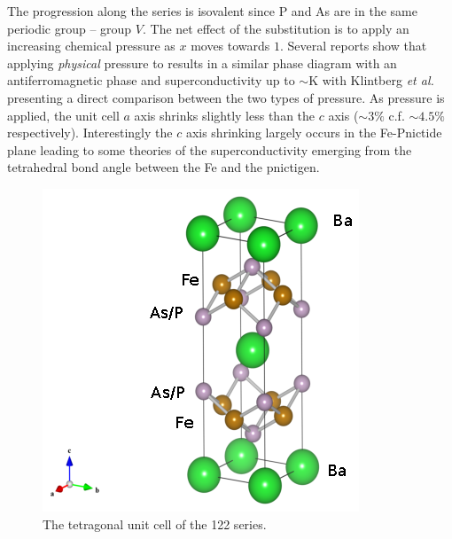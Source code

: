  The progression along the series is isovalent since P and As are in the same periodic group -- group $V$. The net effect of the substitution is to apply an increasing chemical pressure as $x$ moves towards $1$. Several reports show that applying \textit{physical} pressure to \BaFeAs results in a similar phase diagram with an antiferromagnetic phase and superconductivity up to $\sim$\unit[30]{K}\cite{Yamazaki2010,Colombier2009,Alireza2009} with Klintberg \textit{et al.}\cite{Klintberg2010} presenting a direct comparison between the two types of pressure. As pressure is applied, the unit cell $a$ axis shrinks slightly less than the $c$ axis ($\sim3\%$ c.f. $\sim4.5\%$ respectively). Interestingly the $c$ axis shrinking largely occurs in the Fe-Pnictide plane leading to some theories of the superconductivity emerging from the tetrahedral bond angle between the Fe and the pnictigen. %
\begin{figure}[htbp]
    \begin{center}
        \includegraphics[scale=1.0]{Chapter3-dHvABaFe2P2/Figures/BaFe2P2Series/UnitCell/UnitCell}
        \caption{The tetragonal unit cell of the 122 \BaFePAs series.}
        \label{Fig:3:UnitCell}
    \end{center}
\end{figure}


